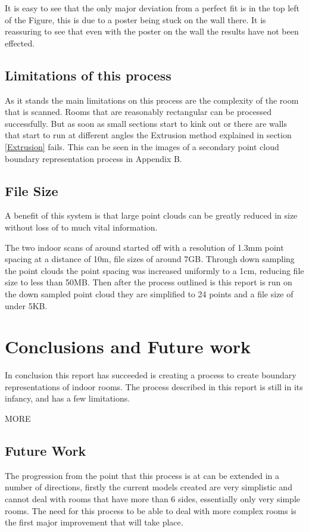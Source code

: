 		It is easy to see that the only major deviation from a perfect fit is in the top left of the Figure, this is due to a poster being stuck on the wall there. It is reassuring to see that even with the poster on the wall the results have not been effected.
	
	\section{Limitations of this process}
		As it stands the main limitations on this process are the complexity of the room that is scanned. Rooms that are reasonably rectangular can be processed successfully. But as soon as small sections start to kink out or there are walls that start to run at different angles the Extrusion method explained in section \ref{Extrusion} fails. This can be seen in the images of a secondary point cloud boundary representation process in Appendix B.
		
	\section{File Size}
	
		A benefit of this system is that large point clouds can be greatly reduced in size without loss of to much vital information. 
		
		The two indoor scans of around started off with a resolution of 1.3mm point spacing at a distance of 10m, file sizes of around 7GB. Through down sampling the point clouds the point spacing was increased uniformly to a 1cm, reducing file size to less than 50MB. Then after the process outlined is this report is run on the down sampled point cloud they are simplified to 24 points and a file size of under 5KB.
		

	
\chapter{Conclusions and Future work}

In conclusion this report has succeeded is creating a process to create boundary representations of indoor rooms. The process described in this report is still in its infancy, and has a few limitations.	

MORE

\section{Future Work}
	The progression from the point that this process is at can be extended in a number of directions, firstly the current models created are very simplistic and cannot deal with rooms that have more than 6 sides, essentially only very simple rooms. The need for this process to be able to deal with more complex rooms is the first major improvement that will take place. 
	
